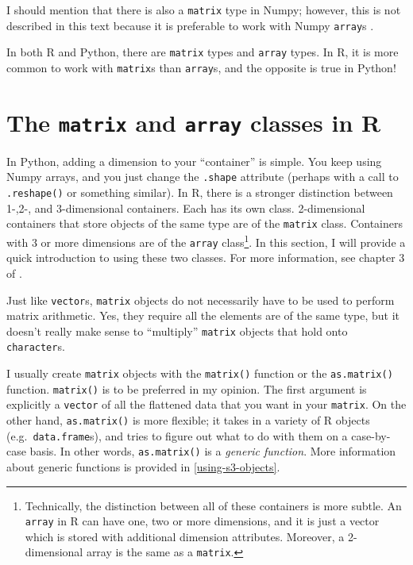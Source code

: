 \documentclass[
  12pt,
  krantz2]{krantz}
\begin{document}
I should mention that there is also a \texttt{matrix} type in Numpy; however, this is not described in this text because it is preferable to work with Numpy \texttt{array}s \citep{ml_with_python_cookbook}.

\begin{rmd-details}
In both R and Python, there are \texttt{matrix} types and \texttt{array} types. In R, it is more common to work with \texttt{matrix}s than \texttt{array}s, and the opposite is true in Python!

\end{rmd-details}

\hypertarget{the-matrix-and-array-classes-in-r}{%
\section{\texorpdfstring{The \texttt{matrix} and \texttt{array} classes in R}{The matrix and array classes in R}}\label{the-matrix-and-array-classes-in-r}}

In Python, adding a dimension to your ``container'' is simple. You keep using Numpy arrays, and you just change the \texttt{.shape} attribute (perhaps with a call to \texttt{.reshape()} or something similar). In R, there is a stronger distinction between 1-,2-, and 3-dimensional containers. Each has its own class. 2-dimensional containers that store objects of the same type are of the \texttt{matrix} class. Containers with 3 or more dimensions are of the \texttt{array} class\footnote{Technically, the distinction between all of these containers is more subtle. An \texttt{array} in R can have one, two or more dimensions, and it is just a vector which is stored with additional dimension attributes. Moreover, a 2-dimensional array is the same as a \texttt{matrix}.}. In this section, I will provide a quick introduction to using these two classes. For more information, see chapter 3 of \citep{matloff_r_book}.

\begin{rmd-caution}
Just like \texttt{vector}s, \texttt{matrix} objects do not necessarily have to be used to perform matrix arithmetic. Yes, they require all the elements are of the same type, but it doesn't really make sense to ``multiply'' \texttt{matrix} objects that hold onto \texttt{character}s.

\end{rmd-caution}

I usually create \texttt{matrix} objects with the \texttt{matrix()} function or the \texttt{as.matrix()} function. \texttt{matrix()} is to be preferred in my opinion. The first argument is explicitly a \texttt{vector} of all the flattened data that you want in your \texttt{matrix}. On the other hand, \texttt{as.matrix()} is more flexible; it takes in a variety of R objects (e.g.~\texttt{data.frame}s), and tries to figure out what to do with them on a case-by-case basis. In other words, \texttt{as.matrix()} is a \emph{generic function}. More information about generic functions is provided in \ref{using-s3-objects}.
\end{document}
